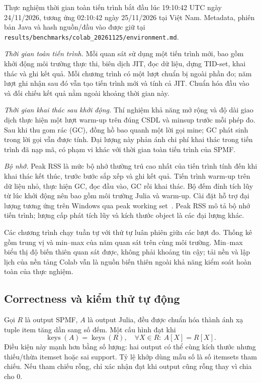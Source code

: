 Thực nghiệm thời gian toàn tiến trình bắt đầu lúc 19:10:42 UTC ngày
24/11/2026, tương ứng 02:10:42 ngày 25/11/2026 tại Việt Nam. Metadata,
phiên bản Java và hash nguồn/đầu vào được giữ tại
\texttt{results/benchmarks/colab\_20261125/environment.md}.

\textit{Thời gian toàn tiến trình.} Mỗi quan sát sử dụng một tiến trình
mới, bao gồm khởi động môi trường thực thi, biên dịch JIT, đọc dữ liệu,
dựng TID-set, khai thác và ghi kết quả. Mỗi chương trình có một lượt
chuẩn bị ngoài phần đo; năm lượt ghi nhận sau đó vẫn tạo tiến trình mới
và tính cả JIT. Chuẩn hóa đầu vào và đối chiếu kết quả nằm ngoài khoảng
thời gian này.

\textit{Thời gian khai thác sau khởi động.} Thí nghiệm khả năng mở rộng
và độ dài giao dịch thực hiện một lượt warm-up trên đúng CSDL và minsup
trước mỗi phép đo. Sau khi thu gom rác (GC), đồng hồ bao quanh một lời
gọi mine; GC phát sinh trong lời gọi vẫn được tính. Đại lượng này phản
ánh chi phí khai thác trong tiến trình đã nạp mã, có phạm vi khác với
thời gian toàn tiến trình của SPMF.

\textit{Bộ nhớ.} Peak RSS là mức bộ nhớ thường trú cao nhất của tiến
trình tính đến khi khai thác kết thúc, trước bước sắp xếp và ghi kết quả.
Tiến trình warm-up trên dữ liệu nhỏ, thực hiện GC, đọc đầu vào, GC rồi
khai thác. Bộ đếm đỉnh tích lũy từ lúc khởi động nên bao gồm môi trường
Julia và warm-up. Cài đặt hỗ trợ đại lượng tương ứng trên Windows qua
peak working set~\cite{windowsrss}. Peak RSS mô tả bộ nhớ tiến trình;
lượng cấp phát tích lũy và kích thước object là các đại lượng khác.

Các chương trình chạy tuần tự với thứ tự luân phiên giữa các lượt đo.
Thống kê gồm trung vị và min--max của năm quan sát trên cùng môi trường.
Min--max biểu thị độ biến thiên quan sát được, không phải khoảng tin cậy;
tải nền và lập lịch của nền tảng Colab vẫn là nguồn biến thiên ngoài
khả năng kiểm soát hoàn toàn của thực nghiệm.

\subsection{Correctness và kiểm thử tự động}
Gọi $R$ là output SPMF, $A$ là output Julia, đều được chuẩn hóa thành
ánh xạ tuple item tăng dần sang số đếm. Một cấu hình đạt khi
\begin{equation}
\operatorname{keys}(A)=\operatorname{keys}(R),\quad
\forall X\in R:\ A[X]=R[X].
\end{equation}
Điều kiện này mạnh hơn bằng số lượng: hai output có thể cùng kích thước
nhưng thiếu/thừa itemset hoặc sai support. Tỷ lệ khớp dùng mẫu số là số
itemsets tham chiếu. Nếu tham chiếu rỗng, chỉ xác nhận đạt khi output cũng
rỗng thay vì chia cho 0.

